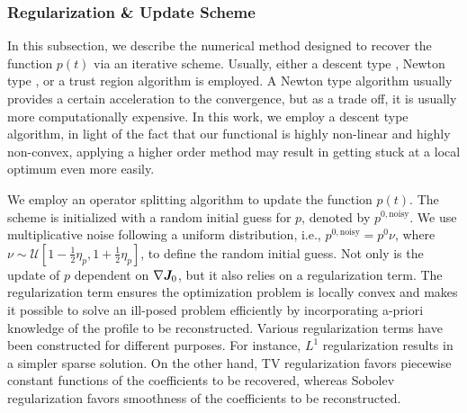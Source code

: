 \subsubsection{Regularization \& Update Scheme} \label{sec_regularization}

In this subsection, we describe the numerical method designed to recover the function $p(t)$ via an iterative scheme.   Usually, either a descent type \cite{CAUCHY1847MethodeSimultanees}, Newton type \cite{Hintermuller2010SemismoothApplications}, or a trust region algorithm \cite{Sun2006OptimizationProgramming} is employed.   A Newton type algorithm usually provides a certain acceleration to the convergence, but as a trade off, it is usually more computationally expensive.  In this work, we employ a descent type algorithm, in light of the fact that our functional is highly non-linear and highly non-convex, applying a higher order method may result in getting stuck at a local optimum even more easily. 

We employ an operator splitting algorithm to update the function $p(t)$.   The scheme is initialized with a random initial guess for $p$, denoted by $p^{0,\text{noisy}}$. We use multiplicative noise following a uniform distribution, i.e., $p^{0,\text{noisy}} = p^{0}\nu$, where $\nu \sim \mathcal{U}\left[1-\frac{1}{2}\eta_{p},1+\frac{1}{2}\eta_{p}\right]$, to define the random initial guess. Not only is the update of $p$ dependent on $\nabla \bm{J}_0$, but it also relies on a regularization term. The regularization term ensures the optimization problem is locally convex and makes it possible to solve an ill-posed problem efficiently by incorporating a-priori knowledge of the profile to be reconstructed. Various regularization terms have been constructed for different purposes. For instance, $L^1$ regularization \cite{Yin2008BregmanSensing,Goodfellow2016DeepLearning} results in a simpler sparse solution. On the other hand, TV regularization \cite{Rudin1992NonlinearAlgorithms} favors piecewise constant functions of the coefficients to be recovered, whereas Sobolev regularization \cite{Fischer2017SobolevAlgorithm} favors smoothness of the coefficients to be reconstructed.

